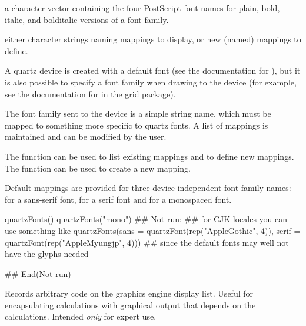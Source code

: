 %
\begin{Arguments}
\begin{ldescription}
\item[\code{family}] a character vector containing the four PostScript font
names for plain, bold, italic, and bolditalic versions of
a font family.
\item[\code{...}] either character strings naming mappings to display,
or new (named) mappings to define.
\end{ldescription}
\end{Arguments}
%
\begin{Details}\relax
A quartz device is created with a default font (see
the documentation for ), but it is also possible
to specify a font family when drawing to the device
(for example, see the documentation for  in the
grid package).

The font family sent to the device is a simple string name, which must be
mapped to something more specific to quartz fonts.  A list of
mappings is maintained and can be modified by the user.

The  function can be used to list existing
mappings and to define new mappings.  The 
function can be used to create a new mapping.

Default mappings are provided for three device-independent font family
names:  for a sans-serif font,  for a serif
font and  for a monospaced font.
\end{Details}
%
\begin{SeeAlso}\relax
{}
\end{SeeAlso}
%
\begin{Examples}
\begin{ExampleCode}
quartzFonts()
quartzFonts("mono")
## Not run: 
## for CJK locales you can use something like
quartzFonts(sans = quartzFont(rep("AppleGothic", 4)),
            serif = quartzFont(rep("AppleMyungjp", 4)))
## since the default fonts may well not have the glyphs needed

## End(Not run)
\end{ExampleCode}
\end{Examples}
%
\begin{Description}\relax
Records arbitrary code on the graphics engine display list.
Useful for encapsulating calculations with graphical output
that depends on the calculations.
Intended \emph{only} for expert use.
\end{Description}
